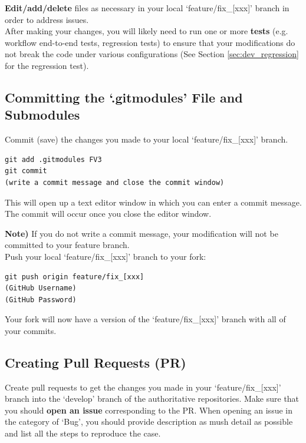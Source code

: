 \documentclass[11pt,fleqn]{report}              %
\begin{document}
{\bf Edit/add/delete} files as necessary in your local `feature/fix\_[xxx]' branch in order to address issues. \\

After making your changes, you will likely need to run one or more {\bf tests} (e.g. workflow end-to-end tests, regression tests) to ensure that your modifications do not break the code under various configurations (See Section \ref{sec:dev_regression} for the regression test).



\subsection{Committing the `.gitmodules' File and Submodules}

Commit (save) the changes you made to your local `feature/fix\_[xxx]' branch.
\lstset{language=bash}   
\begin{lstlisting}[frame=trBL]
git add .gitmodules FV3
git commit
(write a commit message and close the commit window)
\end{lstlisting}
This will open up a text editor window in which you can enter a commit message. The commit will occur once you close the editor window. 

\vspace{0.2cm}

{\bf Note)} If you do not write a commit message, your modification will not be committed to your feature branch. \\

Push your local `feature/fix\_[xxx]' branch to your fork:
\lstset{language=bash}   
\begin{lstlisting}[frame=trBL]
git push origin feature/fix_[xxx]
(GitHub Username)
(GitHub Password)
\end{lstlisting}
Your fork will now have a version of the `feature/fix\_[xxx]' branch with all of your commits.



\subsection{Creating Pull Requests (PR)}

Create pull requests to get the changes you made in your `feature/fix\_[xxx]' branch into the `develop' branch of the authoritative repositories. Make sure that you should {\bf open an issue} corresponding to the PR. When opening an issue in the category of `Bug', you should provide description as mush detail as possible and list all the steps to reproduce the case.
\end{document}
